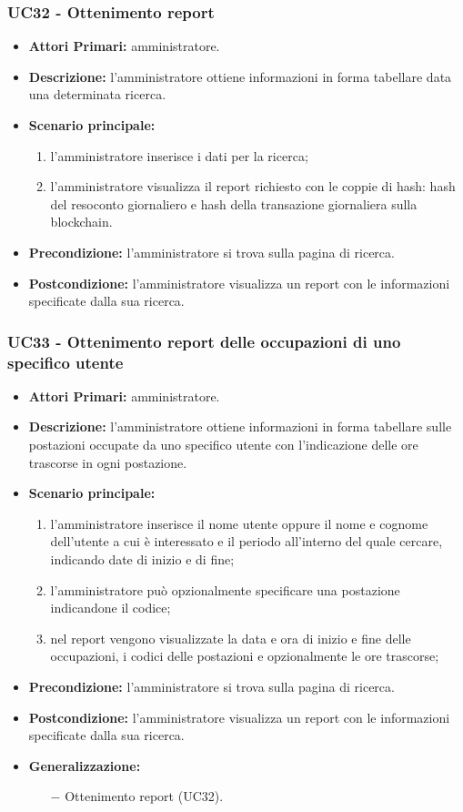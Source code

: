 \subsubsection{ UC32 - Ottenimento report}
\begin{itemize}
	\item\textbf{Attori Primari:} 
	amministratore.
	\item\textbf{Descrizione:} 
	l'amministratore ottiene informazioni in forma tabellare data una determinata ricerca.
	\item\textbf{Scenario principale:} 
	\begin{enumerate}
		\item l'amministratore inserisce i dati per la ricerca;
		\item l'amministratore visualizza il report richiesto con le coppie di hash: hash del resoconto giornaliero e hash della transazione giornaliera sulla blockchain.
	\end{enumerate}
	\item\textbf{Precondizione:} 
	l'amministratore si trova sulla pagina di ricerca.
	\item\textbf{Postcondizione:}
	l'amministratore visualizza un report con le informazioni specificate dalla sua ricerca.
\end{itemize}

\subsubsection{ UC33 - Ottenimento report delle occupazioni di uno specifico utente}
\begin{itemize}
	\item\textbf{Attori Primari:} 
	amministratore.
	\item\textbf{Descrizione:} 
	l'amministratore ottiene informazioni in forma tabellare sulle postazioni occupate da uno specifico utente con l'indicazione delle ore trascorse in ogni postazione.
	\item\textbf{Scenario principale:}
	\begin{enumerate}
		\item l'amministratore inserisce il nome utente oppure il nome e cognome dell'utente a cui è interessato e il periodo all'interno del quale cercare, indicando date di inizio e di fine;
		\item l'amministratore può opzionalmente specificare una postazione indicandone il codice;
		\item nel report vengono visualizzate la data e ora di inizio e fine delle occupazioni, i codici delle postazioni e opzionalmente le ore trascorse;
	\end{enumerate}
	\item\textbf{Precondizione:} 
	l'amministratore si trova sulla pagina di ricerca.
	\item\textbf{Postcondizione:}
	l'amministratore visualizza un report con le informazioni specificate dalla sua ricerca.
	\item\textbf{Generalizzazione:}
	\begin{itemize}
		\item[$-$] Ottenimento report (UC32).
	\end{itemize}
\end{itemize}

